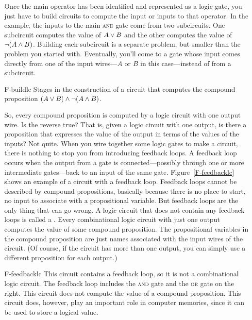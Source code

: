 Once the main operator has been identified and represented as
a logic gate, you just have to build circuits to compute the
input or inputs to that operator.  In the  example,
the inputs to the main \textsc{and} gate come from two subcircuits.
One subcircuit computes the value of $A\vee B$ and the other
computes the value of $\lnot(A\wedge B)$.  Building each subcircuit
is a separate problem, but smaller than the problem you started
with.  Eventually, you'll come to a gate whose input comes directly
from one of the input wires---$A$ or $B$ in this case---instead of
from a subcircuit.


\fig
   {F-buildlc}
   {Stages in the construction of a circuit that computes
    the compound proposition $(A\vee B)\wedge\lnot(A\wedge B)$.}
   {}
   
   


\medbreak
   
So, every compound proposition is computed by a logic circuit
with one output wire.  Is the reverse true?  That is, given
a logic circuit with one output, is there a proposition that
expresses the value of the output in terms of the values of
the inputs?  Not quite.  When you wire together some logic
gates to make a circuit, there is nothing to stop you from
introducing feedback loops.  A feedback loop occurs when
the output from a gate is connected---possibly through one
or more intermediate gates---back to an input of the same gate.
Figure~\ref{F-feedbacklc} shows an example of a circuit with
a feedback loop.
Feedback loops cannot be described by compound propositions,
basically because there is no place to start, no input to
associate with a propositional variable.  But feedback
loops are the only thing that can go wrong.  A logic circuit
that does not contain any feedback loops is called a
.  Every combinational
logic circuit with just one output computes the value of
some compound proposition.  The propositional variables in
the compound proposition are just names associated with
the input wires of the circuit.  (Of course, if the circuit has
more than one output, you can simply use a different proposition
for each output.)  

\fig
   {F-feedbacklc}
   {This circuit contains a feedback loop, so it is not a
    combinational logic circuit.  The feedback loop includes
    the \textsc{and} gate and the \textsc{or} gate on the right.
    This circuit does not compute the value of a compound proposition.
    This circuit does, however, play an important role in computer
    memories, since it can be used to store a logical value.}
   {}

